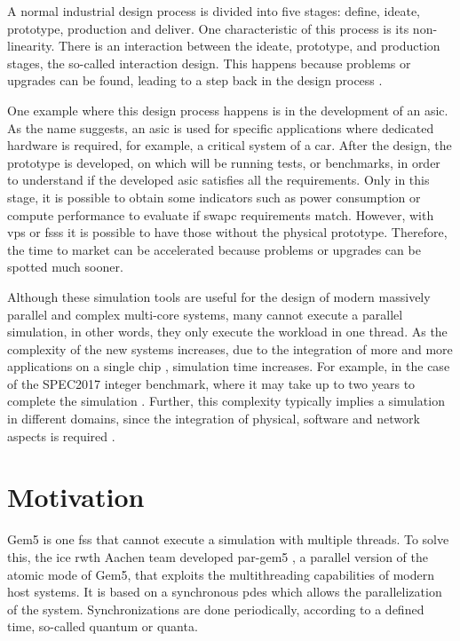 
A normal industrial design process is divided into five stages: define, ideate, prototype, production and deliver. One characteristic of this 
process is its non-linearity. There is an interaction between the ideate, prototype, and production stages, the so-called interaction design. This 
happens because problems or upgrades can be found, leading to a step back in the design process \cite{ProductDesignSteps}.

One example where this design process happens is in the development of an \gls{asic}. As the name suggests, an \gls{asic} is used for specific 
applications where dedicated hardware is required, for example, a critical system of a car. After the design, the prototype is developed, on 
which will be running tests, or benchmarks, in order to understand if the developed \gls{asic} satisfies all the requirements. Only in this stage, 
it is possible to obtain some indicators such as power consumption or compute performance to evaluate if \gls{swapc} requirements match. However, 
with \glspl{vp} or \glspl{fss} it is possible to have those without the physical prototype. Therefore, the time to market can be accelerated 
because problems or upgrades can be spotted much sooner.

Although these simulation tools are useful for the design of modern massively parallel and complex multi-core systems, 
many cannot execute a parallel simulation, in other words, they only execute the workload in one thread. 
As the complexity of the new systems increases, due to the integration of more and more applications on a single chip 
\cite{terascaleComputing}, simulation time increases.
For example, in the case of the SPEC2017 integer benchmark, where it may 
take up to two years to complete the simulation \cite{pargem5}. Further, this complexity typically implies a simulation in different domains, 
since the integration of physical, software and network aspects is required \cite{gomes2017co}.

\section{Motivation}

Gem5 is one \gls{fss} that cannot execute a simulation with multiple threads. To solve this, the \gls{ice} \gls{rwth} Aachen team developed 
par-gem5 \cite{pargem5}, a parallel version of the atomic mode of Gem5, that exploits the multithreading capabilities of modern host systems. 
It is based on a synchronous \gls{pdes} which allows the parallelization of the system. Synchronizations are done periodically, according to a 
defined time, so-called quantum or quanta.

